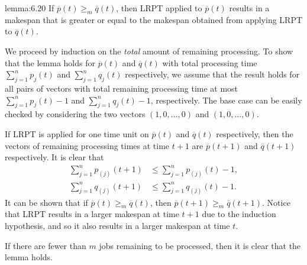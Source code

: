 \begin{lemma}{lemma:6.20}
    If $\overline p(t) \geq_m \overline q(t)$, then LRPT applied to 
    $\overline p(t)$ results in a makespan that is greater or equal to 
    the makespan obtained from applying LRPT to $\overline q(t)$. 
\end{lemma}
\begin{pf}
    We proceed by induction on the \emph{total} amount of remaining processing.
    To show that the lemma holds for $\overline p(t)$ and $\overline q(t)$ 
    with total processing time $\sum_{j=1}^n p_j(t)$ and $\sum_{j=1}^n q_j(t)$ 
    respectively, we assume that the result holds for all pairs of vectors 
    with total remaining processing time at most $\sum_{j=1}^n p_j(t) - 1$ 
    and $\sum_{j=1}^n q_j(t) - 1$, respectively. The base case can be 
    easily checked by considering the two vectors $(1, 0, \dots, 0)$ and 
    $(1, 0, \dots, 0)$. 

    If LRPT is applied for one time unit on $\overline p(t)$ and $\overline q(t)$ 
    respectively, then the vectors of remaining processing times at time 
    $t+1$ are $\overline p(t+1)$ and $\overline q(t+1)$ respectively. It is 
    clear that 
    \begin{align*}
        \sum_{j=1}^n p_{(j)}(t+1) &\leq \sum_{j=1}^n p_{(j)}(t) - 1, \\ 
        \sum_{j=1}^n q_{(j)}(t+1) &\leq \sum_{j=1}^n q_{(j)}(t) - 1.
    \end{align*}
    It can be shown that if $\overline p(t) \geq_m \overline q(t)$, then 
    $\overline p(t+1) \geq_m \overline q(t+1)$. Notice that LRPT results in a 
    larger makespan at time $t + 1$ due to the induction hypothesis, 
    and so it also results in a larger makespan at time $t$. 

    If there are fewer than $m$ jobs remaining to be processed, then 
    it is clear that the lemma holds. 
\end{pf}

